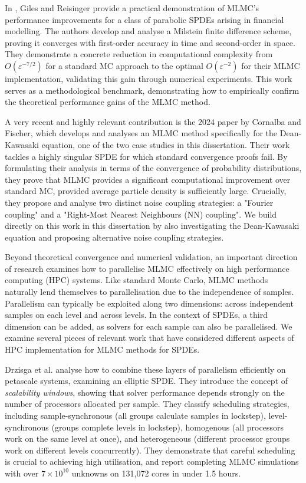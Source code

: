 In \cite{giles2012stochastic}, Giles and Reisinger provide a practical demonstration of 
MLMC's performance improvements for a class of parabolic SPDEs arising in financial modelling. 
The authors develop and analyse a Milstein finite difference scheme, proving it converges with 
first-order accuracy in time and second-order in space. They demonstrate a concrete reduction
in computational complexity from $O(\varepsilon^{-7/2})$ for a standard MC approach to the optimal 
$O(\varepsilon^{-2})$ for their MLMC implementation, validating this gain through 
numerical experiments. This work serves as a methodological benchmark, demonstrating how to 
empirically confirm the theoretical performance gains of the MLMC method.

A very recent and highly relevant contribution is the 2024 paper by 
Cornalba and Fischer, which 
develops and analyses an MLMC method specifically for the Dean-Kawasaki equation, 
one of the two case studies in this dissertation. Their work tackles a highly singular SPDE 
for which standard convergence proofs fail. By formulating their analysis in terms 
of the convergence of probability distributions, they prove that MLMC provides a 
significant computational improvement over standard MC, provided average 
particle density is sufficiently large. Crucially, they propose and 
analyse two distinct noise coupling strategies:
a "Fourier coupling" and a "Right-Most Nearest Neighbours (NN) coupling". We build directly
on this work in this dissertation by also investigating the Dean-Kawasaki equation and proposing 
alternative noise coupling strategies.


Beyond theoretical convergence and numerical validation, an important 
direction of research examines how to parallelise MLMC effectively on 
high performance computing (HPC) systems. Like standard Monte Carlo, 
MLMC methods naturally lend themselves to parallelisation due to the 
independence of samples. Parallelism can typically be exploited along 
two dimensions: across independent samples on each level and across levels. 
In the context of SPDEs, a third dimension can be added, as
solvers for each sample can also be parallelised. We examine several 
pieces of relevant work that have considered different aspects of 
HPC implementation for MLMC methods for SPDEs.

Drzisga et al.  \cite{drzisga2017scheduling} analyse how to combine 
these layers of parallelism efficiently on petascale systems, examining 
an elliptic SPDE. They 
introduce the concept of \textit{scalability windows}, showing 
that solver performance depends strongly on the number of 
processors allocated per sample. They classify 
scheduling strategies, including sample-synchronous (all groups 
calculate samples in lockstep), level-synchronous (groups complete 
levels in lockstep), homogenous (all processors work on the 
same level at once), and heterogeneous (different processor 
groups work on different levels concurrently). They demonstrate that 
careful scheduling is crucial to achieving high utilisation, and report 
completing MLMC simulations with over $7 \times 10^{10}$ unknowns 
on 131,072 cores in under 1.5 hours.

